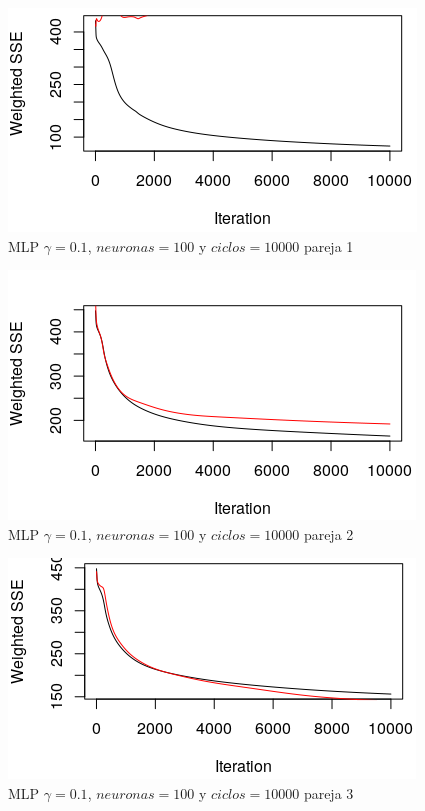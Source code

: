 \documentclass[11pt,spanish,listoffigures,listoftables]{workluis}
\begin{document}
\begin{figure}[H]
\centering
\includegraphics[scale=5]{011001}
\caption{MLP $\gamma = 0.1$, $neuronas = 100$ y $ciclos = 10000$ pareja 1}
\end{figure} 

\begin{figure}[H]
\centering
\includegraphics[scale=5]{011002}
\caption{MLP $\gamma = 0.1$, $neuronas = 100$ y $ciclos = 10000$ pareja 2}
\end{figure} 

\begin{figure}[H]
\centering
\includegraphics[scale=5]{011003}
\caption{MLP $\gamma = 0.1$, $neuronas = 100$ y $ciclos = 10000$ pareja 3}
\end{figure} 
\end{document}
